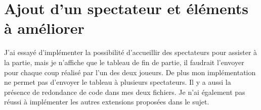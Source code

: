 \documentclass[11pt,a4paper]{report}
\begin{document}
\chapter{Ajout d'un spectateur et éléments à améliorer}
\quad J'ai essayé d'implémenter la possibilité d'accueillir des spectateurs pour assister à la partie, mais je n'affiche que le tableau de fin de partie, il faudrait l'envoyer pour chaque coup réalisé par l'un des deux joueurs. De plus mon implémentation ne permet pas d'envoyer le tableau à plusieurs spectateurs. Il y a aussi la présence de redondance de code dans mes deux fichiers. Je n'ai également pas réussi à implémenter les autres extensions proposées dans le sujet.
\end{document}
